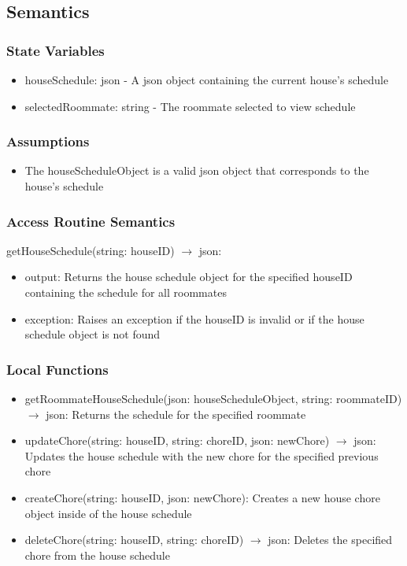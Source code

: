 \documentclass[12pt, titlepage]{article}
\begin{document}
\subsection{Semantics}

\subsubsection{State Variables}

\begin{itemize}
  \item houseSchedule: json - A json object containing the current house's schedule
  \item selectedRoommate: string - The roommate selected to view schedule
\end{itemize}


\subsubsection{Assumptions}

\begin{itemize}
  \item The houseScheduleObject is a valid json object that corresponds to the house's schedule
\end{itemize}

\subsubsection{Access Routine Semantics}

\noindent getHouseSchedule(string: houseID) $\rightarrow$ json:
\begin{itemize}
\item output: Returns the house schedule object for the specified houseID containing the schedule for all roommates
\item exception: Raises an exception if the houseID is invalid or if the house schedule object is not found
\end{itemize}


\subsubsection{Local Functions}

\begin{itemize}
  \item getRoommateHouseSchedule(json: houseScheduleObject, string: roommateID) $\rightarrow$ json: Returns the schedule for the specified roommate
  \item updateChore(string: houseID, string: choreID, json: newChore) $\rightarrow$ json: Updates the house schedule with the new chore for the specified previous chore
  \item createChore(string: houseID, json: newChore): Creates a new house chore object inside of the house schedule
  \item deleteChore(string: houseID, string: choreID) $\rightarrow$ json: Deletes the specified chore from the house schedule

\end{itemize}
\end{document}
